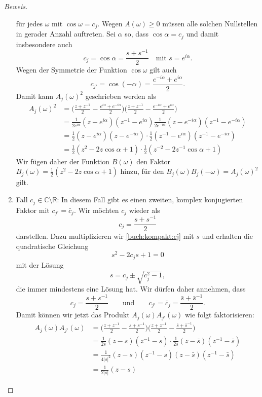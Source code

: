 \begin{proof}[Beweis]
\begin{enumerate}
für jedes $\omega$ mit $\cos\omega=c_j$.
Wegen $A(\omega)\ge 0$ müssen alle solchen Nullstellen in gerader
Anzahl auftreten.
Sei $\alpha$ so, dass $\cos\alpha = c_j$ und damit insbesondere auch
\[
c_j
=
\cos\alpha
=
\frac{s+s^{-1}}2
\quad\text{mit $s=e^{i\alpha}$}.
\]
Wegen der Symmetrie der Funktion $\cos\omega$ gilt auch
\[
c_{j'}=
\cos(-\alpha)
=
\frac{e^{-i\alpha}+e^{i\alpha}}2.
\]
Damit kann $A_j(\omega)^2$ geschrieben werden als
\begin{align*}
A_j(\omega)^2
&=
\biggl(
\frac{z+z^{-1}}2-\frac{e^{i\alpha}+e^{-i\alpha}}2
\biggr)
\biggl(
\frac{z+z^{-1}}2-\frac{e^{-i\alpha}+e^{i\alpha}}2
\biggr)
\\
&=
\frac{1}{2e^{i\alpha}}
(z-e^{i\alpha})
(z^{-1}-e^{i\alpha})
\frac{1}{2e^{-i\alpha}}
(z-e^{-i\alpha})
(z^{-1}-e^{-i\alpha})
\\
&=
\frac{1}{2}
(z-e^{i\alpha})
(z-e^{-i\alpha})
\cdot
\frac{1}{2}
(z^{-1}-e^{i\alpha})
(z^{-1}-e^{-i\alpha})
\\
&=
\frac{1}{2}
(z^2-2z\cos\alpha +1)
\cdot
\frac{1}{2}
(z^{-2}-2z^{-1}\cos\alpha +1)
\end{align*}
Wir fügen daher der Funktion $B(\omega)$ den Faktor
$B_j(\omega)=\frac12(z^2-2z\cos\alpha +1)$ hinzu, für
den 
$B_j(\omega)B_j(-\omega)=A_j(\omega)^2$ gilt.
\item
Fall $c_j\in\mathbb C\setminus\mathbb R$:
In diesem Fall gibt es einen zweiten, komplex konjugierten Faktor mit
$c_{j'}=\bar{c}_j$.
Wir möchten $c_j$ wieder als
\begin{equation}
c_j
=
\frac{s+s^{-1}}2
\label{buch:kompakt:cj}
\end{equation}
darstellen.
Dazu multiplizieren wir \eqref{buch:kompakt:cj} mit $s$ und erhalten die
quadratische Gleichung
\[
s^2-2c_j s+1=0
\]
mit der Lösung
\[
s=c_j\pm\sqrt{c_j^2-1},
\]
die immer mindestens eine Lösung hat.
Wir dürfen daher annehmen, dass
\[
c_j = \frac{s+s^{-1}}2
\qquad\text{und}\qquad
c_{j'} = \bar{c}_j = \frac{\bar{s}+\bar{s}^{-1}}2.
\]
Damit können wir jetzt das Produkt $A_j(\omega)A_{j'}(\omega)$ 
wie folgt faktorisieren:
\begin{align*}
A_j(\omega)A_{j'}(\omega)
&=
\biggl(
\frac{z+z^{-1}}2 - \frac{s+s^{-1}}2
\biggr)
\biggl(
\frac{z+z^{-1}}2 - \frac{\bar{s}+\bar{s}^{-1}}2
\biggr)
\\
&=
\frac{1}{2s}
(z-s)(z^{-1}-s)
\cdot
\frac{1}{2\bar{s}}
(z-\bar{s})(z^{-1}-\bar{s})
\\
&=
\frac{1}{4|s|^2}(z-s)(z^{-1}-s)(z-\bar{s})(z^{-1}-\bar{s})
\\
&=
\frac1{2|s|}
(z-s)

\end{align*}
\end{enumerate}
\end{proof}
